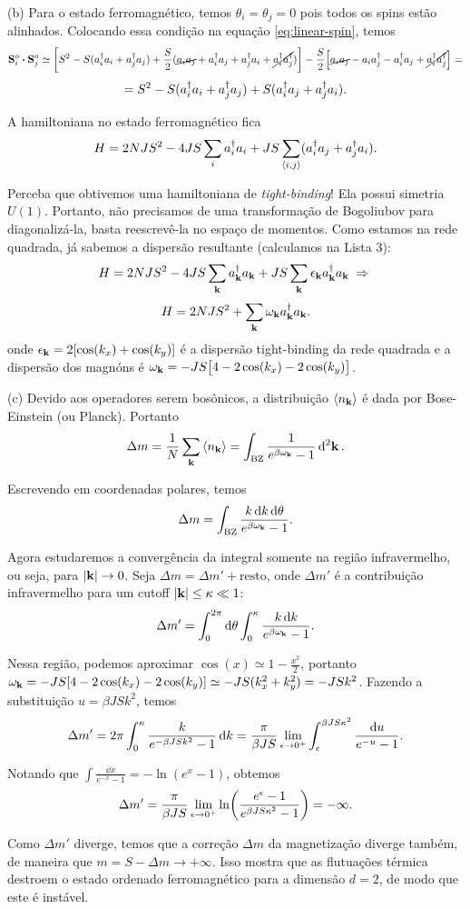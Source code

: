\documentclass[a4paper,10pt]{article}
\begin{document}
\n

(b) Para o estado ferromagnético, temos $\theta_i = \theta_j = 0$ pois todos os spins estão alinhados. Colocando essa condição na equação \ref{eq:linear-spin}, temos
$$
\vb{S}_i^o \vdot \vb{S}_j^o \simeq
\qty[
S^2 - S(a_i^\d a_i + a_j^\d a_j) +
\frac{S}{2} (\cancel{a_i a_j} + a_i^\d a_j + a_j^\d a_i + \cancel{a_i^\d a_j^\d})
]
-\frac{S}{2}
\Big[
\cancel{a_ia_j} - a_ia_j^\d - a_i^\d a_j + \cancel{a_i^\d a_j^\d}
\Big] =
$$
$$
= S^2 - S (a_i^\dagger a_i + a_j^\dagger a_j) + S (a_i^\dagger a_j + a_j^\dagger a_i).
$$

A hamiltoniana no estado ferromagnético fica
$$
H = 2 N J S^2 - 4 JS \sum_{i} a_i^\dagger a_i + JS \sum_{\left\langle i , j \right\rangle} (a_i^\dagger a_j + a_j^\dagger a_i).
$$

Perceba que obtivemos uma hamiltoniana de \textit{tight-binding}! Ela possui simetria $U(1)$. Portanto, não precisamos de uma transformação de Bogoliubov para diagonalizá-la, basta reescrevê-la no espaço de momentos. Como estamos na rede quadrada, já sabemos a dispersão resultante (calculamos na Lista 3):
$$
H = 2 N J S^2 - 4 JS \sum_{\vb{k}} a_{\vb{k}}^\dagger a_{\vb{k}} + JS \sum_{\vb{k}} \epsilon_{\vb{k}} a_{\vb{k}}^\dagger a_{\vb{k}} \; \Rightarrow \;
$$
$$
H = 2 N J S^2 + \sum_{\vb{k}} \omega_{\vb{k}} a_{\vb{k}}^\dagger a_{\vb{k}}.
$$
onde $\epsilon_{\vb{k}} = 2 [\cos(k_x) + \cos(k_y)]$ é a dispersão tight-binding da rede quadrada e a dispersão dos magnóns é $\omega_{\vb{k}} = - JS \big[4 - 2 \cos(k_x) - 2 \cos(k_y) \big]$.

\n

(c) Devido aos operadores serem bosônicos, a distribuição $\ev{n_{\k}}$ é dada por Bose-Einstein (ou Planck). Portanto
$$
\Delta m = \frac{1}{N} \sum_{\k} \ev{n_{\k}} = \int_{\text{BZ}} \frac{1}{e^{\beta \omega_{\k}}-1} \dd[2]{\k}.
$$

Escrevendo em coordenadas polares, temos
$$
\Delta m = \int_{\text{BZ}} \frac{k \dd{k} \dd{\theta}}{e^{\beta\omega_{\vb{k}}} - 1}.
$$

Agora estudaremos a convergência da integral somente na região infravermelho, ou seja, para $\abs{\vb{k}} \to 0$. Seja $\Delta m = \Delta m' + \text{resto}$, onde $\Delta m'$ é a contribuição infravermelho para um cutoff $\abs{\vb{k}} \leq \kappa \ll 1$:
$$
\Delta m' = \int_0^{2\pi} \dd{\theta} \int_0^\kappa \frac{k \dd{k}}{e^{\beta \omega_{\vb{k}}} - 1}.
$$

Nessa região, podemos aproximar $\cos(x) \simeq 1 - \frac{x^2}{2}$, portanto $\omega_{\vb{k}} = -JS [4 - 2\cos(k_x) - 2\cos(k_y)] \simeq - JS (k_x^2 + k_y^2) = -JS k^2$. Fazendo a substituição $u = \beta J S k^2$, temos
$$
\Delta m' = 2\pi \int_0^\kappa \frac{k}{e^{-\beta JS k^2} - 1} \dd{k} =
\frac{\pi}{\beta J S} \lim_{\epsilon \to 0^+} \int_{\epsilon}^{\beta J S \kappa^2} \frac{\dd{u}}{e^{-u} - 1}.
$$

Notando que $\int \frac{\dd{x}}{e^{-x} - 1} = - \ln(e^x - 1)$, obtemos
$$
\Delta m' = \frac{\pi}{\beta JS} \lim_{\epsilon \to 0^+} \ln(\frac{e^\epsilon-1}{e^{\beta JS\kappa^2}-1}) = -\infty.
$$

Como $\Delta m'$ diverge, temos que a correção $\Delta m$ da magnetização diverge também, de maneira que $m = S - \Delta m \to +\infty$. Isso mostra que as flutuações térmica destroem o estado ordenado ferromagnético para a dimensão $d = 2$, de modo que este é instável.
\end{document}
